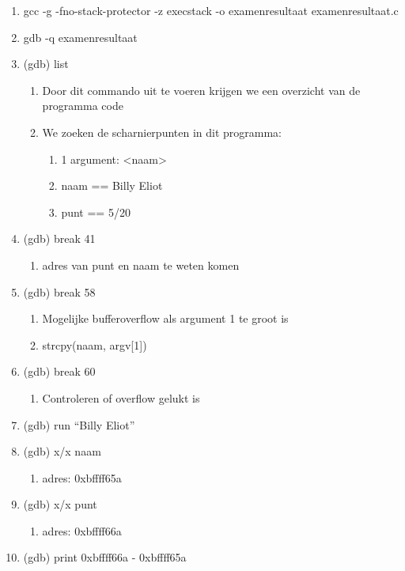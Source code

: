 \begin{enumerate}
  \item gcc -g -fno-stack-protector -z execstack -o examenresultaat examenresultaat.c
  \item gdb -q examenresultaat
  \item (gdb) list
  	\begin{enumerate}
  	\item Door dit commando uit te voeren krijgen we een overzicht van de programma code
  	\item We zoeken de scharnierpunten in dit programma:
  		\begin{enumerate}
  		\item 1 argument: \textless naam\textgreater
  		\item naam == Billy Eliot
  		\item punt == 5/20
  		\end{enumerate}
  	\end{enumerate}
  \item (gdb) break 41
  	\begin{enumerate}
  	\item adres van punt en naam te weten komen
  	\end{enumerate}
  \item (gdb) break 58
  	\begin{enumerate}
  	\item Mogelijke bufferoverflow als argument 1 te groot is
  	\item strcpy(naam, argv[1])
  	\end{enumerate}
  \item (gdb) break 60
  	\begin{enumerate}
  	\item Controleren of overflow gelukt is
  	\end{enumerate}
  \item (gdb) run ``Billy Eliot''
  \item (gdb) x/x naam
  	\begin{enumerate}
  	\item adres: 0xbffff65a
  	\end{enumerate}
  \item (gdb) x/x punt
  	\begin{enumerate}
  	\item adres: 0xbffff66a
  	\end{enumerate}
  \item (gdb) print 0xbffff66a - 0xbffff65a
  	\begin{enumerate}

\end{enumerate}
\end{enumerate}
